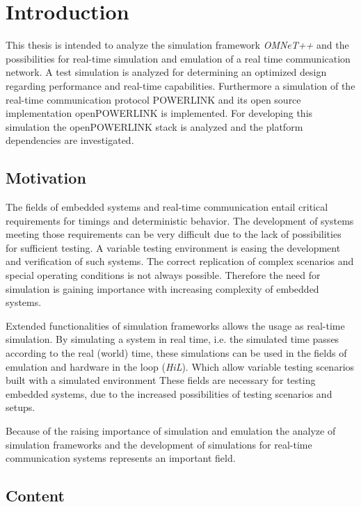 \chapter{Introduction}
\label{cha:introduction}
This thesis is intended to analyze the simulation framework \emph{OMNeT++} \cite{omnet_manual} and the possibilities for real-time simulation and emulation of a real time communication network.
A test simulation is analyzed for determining an optimized design regarding performance and real-time capabilities.
Furthermore a simulation of the real-time communication protocol POWERLINK and its open source implementation \mbox{openPOWERLINK} \cite{openpowerlink} is implemented. 
For developing this simulation the openPOWERLINK stack is analyzed and the platform dependencies are investigated.

\section{Motivation}
The fields of embedded systems and real-time communication entail critical requirements for timings and deterministic behavior.
The development of systems meeting those requirements can be very difficult due to the lack of possibilities for sufficient testing.
A variable testing environment is easing the development and verification of such systems.
The correct replication of complex scenarios and special operating conditions is not always possible.
Therefore the need for simulation is gaining importance with increasing complexity of embedded systems.

Extended functionalities of simulation frameworks allows the usage as real-time simulation.
By simulating a system in real time, i.e. the simulated time passes according to the real (world) time, these simulations can be used in the fields of emulation and hardware in the loop (\emph{HiL}).
Which allow variable testing scenarios built with a simulated environment
These fields are necessary for testing embedded systems, due to the increased possibilities of testing scenarios and setups.

Because of the raising importance of simulation and emulation the analyze of simulation frameworks and the development of simulations for real-time communication systems represents an important field.

\section{Content}

